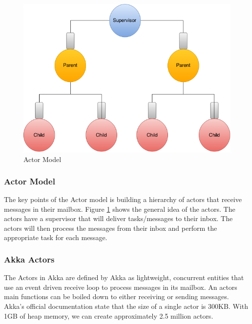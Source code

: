 \begin{figure}[h]
	\centering
	\includegraphics[scale=0.4]{images/tools/ActorModel.png} 
	\caption{Actor Model}
	\label{fig:ActorModel}
\end{figure}
\subsubsection{Actor Model}
The key points of the Actor model is building a hierarchy of  actors that receive messages in their mailbox. Figure \ref{fig:ActorModel} shows the general idea of the actors. The actors have a supervisor that will deliver tasks/messages to their inbox. The actors will then process the messages from their inbox and perform the appropriate task for each message. 
\subsubsection{Akka Actors}
The Actors in Akka are defined by Akka as lightweight, concurrent entities that use an event driven receive loop to process messages in its mailbox. An actors main functions can be boiled down to either receiving or sending messages. Akka's official documentation state that the size of a single actor is 300KB. With 1GB of heap memory, we can create approximately 2.5 million actors. 


